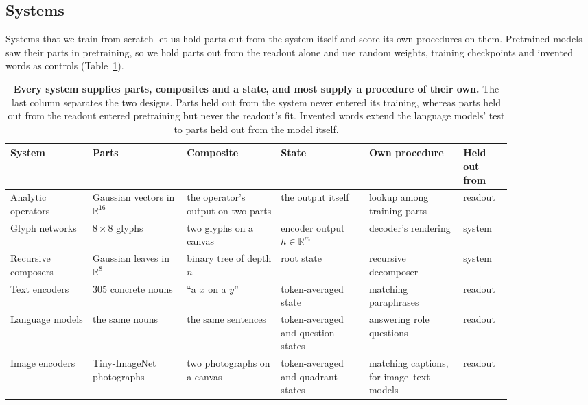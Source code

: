 \documentclass[10pt]{article}
\theoremstyle{plain}
\theoremstyle{remark}
\newcommand{\R}{\mathbb{R}}
\begin{document}
\subsection{Systems}

Systems that we train from scratch let us hold parts out from the system itself and score its own procedures on them. Pretrained models saw their parts in pretraining, so we hold parts out from the readout alone and use random weights, training checkpoints and invented words as controls (Table~\ref{tab:systems}).

\begin{table}[t]
  \centering
  \small
  \caption{\textbf{Every system supplies parts, composites and a state, and most supply a procedure of their own.} The last column separates the two designs. Parts held out from the system never entered its training, whereas parts held out from the readout entered pretraining but never the readout's fit. Invented words extend the language models' test to parts held out from the model itself.}
  \label{tab:systems}
  \begin{tabular}{@{}p{0.14\linewidth}p{0.16\linewidth}p{0.16\linewidth}p{0.15\linewidth}p{0.16\linewidth}p{0.08\linewidth}@{}}
    \toprule
    System & Parts & Composite & State & Own procedure & Held out from \\
    \midrule
    Analytic operators & Gaussian vectors in $\R^{16}$ & the operator's output on two parts & the output itself & lookup among training parts & readout \\
    Glyph networks & $8 \times 8$ glyphs & two glyphs on a canvas & encoder output $h \in \R^m$ & decoder's rendering & system \\
    Recursive composers & Gaussian leaves in $\R^8$ & binary tree of depth $n$ & root state & recursive decomposer & system \\
    Text encoders & 305 concrete nouns & ``a $x$ on a $y$'' & token-averaged state & matching paraphrases & readout \\
    Language models & the same nouns & the same sentences & token-averaged and question states & answering role questions & readout \\
    Image encoders & Tiny-ImageNet photographs & two photographs on a canvas & token-averaged and quadrant states & matching captions, for image--text models & readout \\
    \bottomrule
  \end{tabular}
\end{table}
\end{document}
